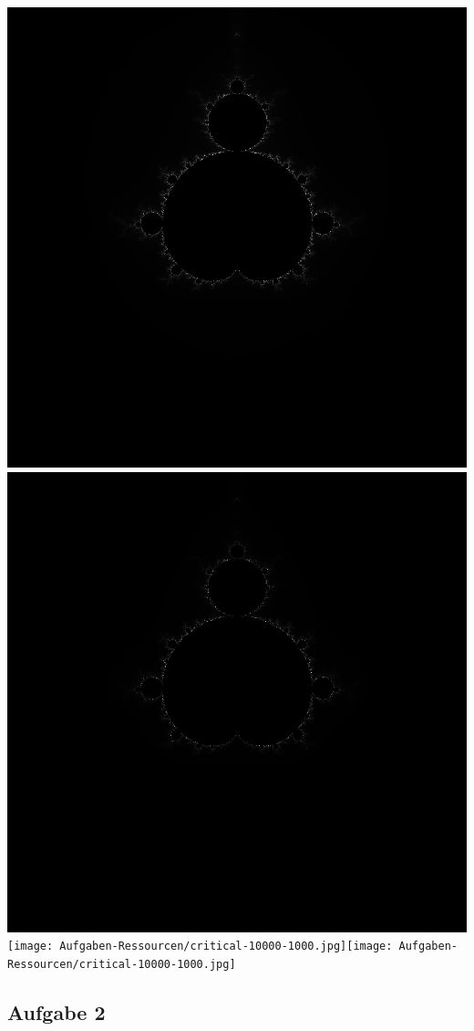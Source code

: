 \documentclass{article}
\begin{document}
	\begin{center}
		\includegraphics[width=0.4\linewidth]{Aufgaben-Ressourcen/critical-1000.jpg}\quad\includegraphics[width=0.4\linewidth]{Aufgaben-Ressourcen/critical-1000-1000.jpg}
		\\[\baselineskip]
		\texttt{[image: Aufgaben-Ressourcen/critical-10000-1000.jpg]}\quad\texttt{[image: Aufgaben-Ressourcen/critical-10000-1000.jpg]}
	\end{center}


    \subsection{Aufgabe 2}
\end{document}
